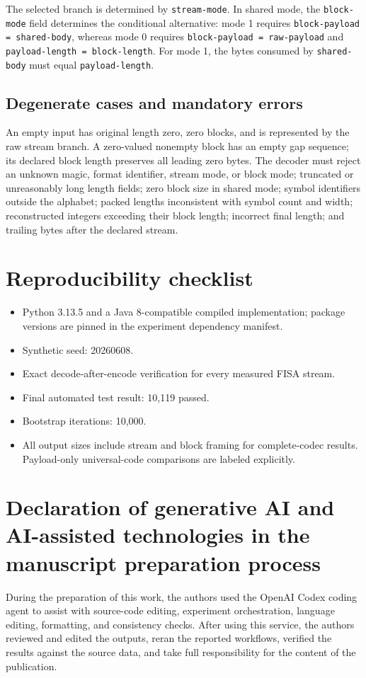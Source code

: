 \documentclass[a4paper,fleqn]{cas-dc}
\begin{document}
The selected branch is determined by \texttt{stream-mode}. In shared mode,
the \texttt{block-mode} field determines the conditional alternative:
mode 1 requires \texttt{block-payload = shared-body}, whereas mode 0 requires
\texttt{block-payload = raw-payload} and
\texttt{payload-length = block-length}. For mode 1, the bytes consumed by
\texttt{shared-body} must equal \texttt{payload-length}.

\subsection{Degenerate cases and mandatory errors}

An empty input has original length zero, zero blocks, and is represented by
the raw stream branch. A zero-valued nonempty block has an empty gap sequence;
its declared block length preserves all leading zero bytes. The decoder must
reject an unknown magic, format identifier, stream mode, or block mode;
truncated or unreasonably long length fields; zero block size in shared mode;
symbol identifiers outside the alphabet; packed lengths inconsistent with
symbol count and width; reconstructed integers exceeding their block length;
incorrect final length; and trailing bytes after the declared stream.

\section{Reproducibility checklist}
\label{app:reproducibility}

\begin{itemize}
\item Python 3.13.5 and a Java 8-compatible compiled implementation; package
versions are pinned in the experiment dependency manifest.
\item Synthetic seed: 20260608.
\item Exact decode-after-encode verification for every measured FISA stream.
\item Final automated test result: 10,119 passed.
\item Bootstrap iterations: 10,000.
\item All output sizes include stream and block framing for complete-codec
results. Payload-only universal-code comparisons are labeled explicitly.
\end{itemize}

\section*{Declaration of generative AI and AI-assisted technologies in the
manuscript preparation process}

During the preparation of this work, the authors used the OpenAI Codex coding
agent to assist
with source-code editing, experiment orchestration, language editing,
formatting, and consistency checks. After using this service, the authors
reviewed and edited the outputs, reran the reported workflows, verified the
results against the source data, and take full responsibility for the content
of the publication.

\clearpage


\end{document}

